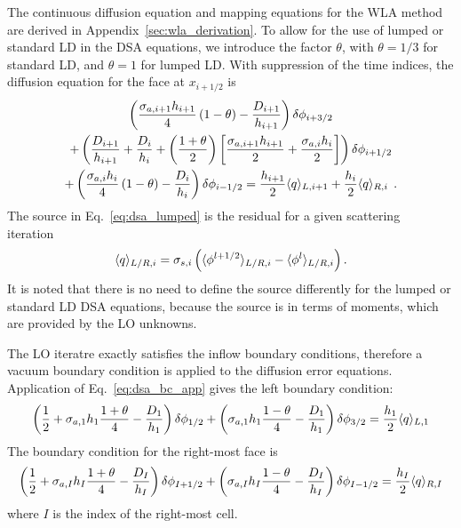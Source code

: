 The continuous diffusion equation and mapping equations for the WLA method are derived in Appendix~\ref{sec:wla_derivation}.
To allow for the use of lumped
or standard LD in the DSA equations, we introduce the factor $\theta$, with
$\theta=1/3$ for standard
LD, and $\theta=1$ for lumped LD.  With suppression of the time indices, the diffusion equation for the face at $x_{i+1/2}$ is 
\begin{multline}\label{eq:dsa_lumped}
    \left(\frac{\sigma_{a,i+1} h_{i+1}}{4}\left(1 - \theta\right)  -
        \frac{D_{i+1}}{h_{i+1}}\right)\delta\phi_{i+3/2}  \\ + \left(\frac{D_{i+1}}{h_{i+1}} +
        \frac{D_{i}}{h_i} + \left(\frac{1+\theta}{2} \right)\left[\frac{\sigma_{a,i+1} h_{i+1}}{2} + \frac{\sigma_{a,i}
        h_{i}}{2}\right]\right)\delta\phi_{i+1/2} \\ +  \left(\frac{\sigma_{a,i}
        h_{i}}{4}\left(1 - \theta\right) -
        \frac{D_{i}}{h_{i}}\right)\delta\phi_{i-1/2} = \frac{h_{i+1}}{2} \langle q \rangle_{L,i+1} +
        \frac{h_{i}}{2}\langle q \rangle_{R,i}
        \;\,. 
\end{multline}
The source in Eq.~\eqref{eq:dsa_lumped} is the residual for a given scattering iteration~\cite{larson_morel_sn,lewis}
\begin{equation}\label{eq:dsa_src}
    \langle q \rangle_{L/R,i} = \sigma_{s,i}\left(\langle \phi^{l+1/2} \rangle_{L/R,i} -
    \langle \phi^{l} \rangle_{L/R,i}\right).
\end{equation}
It is noted that there is no need to define the source differently for the lumped or
standard LD DSA equations, because the source is in terms of moments, which are provided
by the LO unknowns.

The LO iteratre exactly satisfies the inflow boundary conditions, therefore
a vacuum boundary condition is applied to the diffusion error equations.
Application of Eq.~\eqref{eq:dsa_bc_app} gives the left boundary condition:
\begin{equation}\label{eq:bc_dsa}
    \left(\frac{1}{2}+ \sigma_{a,1}h_1\frac{1+\theta}{4} - \frac{D_1}{h_1}\right)\delta\phi_{1/2} +
    \left( {\sigma_{a,1}{h_1}}\frac{1-\theta}{4} - \frac{D_1}{h_1}  \right)\delta \phi_{3/2} =
    \frac{h_1}{2} \langle q \rangle_{L,1}
\end{equation}
The boundary condition for the right-most face is
\begin{equation}\label{eq:bc_dsar}
    \left(\frac{1}{2}+ \sigma_{a,I}h_I\frac{1+\theta}{4} - \frac{D_I}{h_I}\right)\delta\phi_{I+1/2} +
    \left( {\sigma_{a,I}{h_I}}\frac{1-\theta}{4} - \frac{D_I}{h_I}  \right)\delta\phi_{I-1/2} =
    \frac{h_I}{2} \langle q \rangle_{R,I}
\end{equation}
where $I$ is the index of the right-most cell. 

